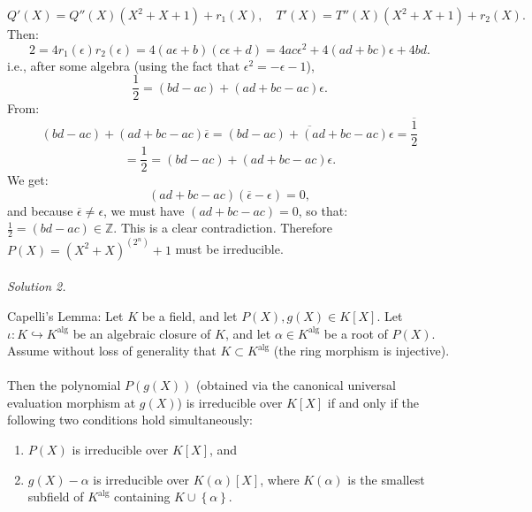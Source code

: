 \begin{solution}
    \[
        Q'\left(X\right) = Q''\left(X\right)\left( X^2 + X + 1 \right) + r_1\left(X\right), \quad T'\left(X\right) = T''\left(X\right)\left( X^2 + X + 1 \right) + r_2\left(X\right).
    \]
    Then:
    \[
        2 = 4 r_1\left(\epsilon\right) r_2\left(\epsilon\right) = 4\left(a\epsilon + b\right)\left(c\epsilon + d\right) = 4ac\epsilon^2 + 4\left(ad + bc\right)\epsilon + 4bd.
    \]
    i.e., after some algebra (using the fact that \( \epsilon^2 = -\epsilon - 1 \)),
    \[
        \frac{1}{2} = \left( bd - ac \right) + \left( ad + bc- ac \right) \epsilon.
    \]
    From:
    \[
        \left( bd - ac \right) + \left( ad + bc - ac \right) \overline{\epsilon} = \overline{\left( bd - ac \right) + \left( ad + bc - ac \right) \epsilon} = \overline{\frac{1}{2}}
    \]
    \[
        = \frac{1}{2} = \left( bd - ac \right) + \left( ad + bc - ac \right) \epsilon.
    \]
    We get:
    \[
        \left( ad + bc - ac \right) \left( \overline{\epsilon} - \epsilon \right) = 0,
    \]
    and because \( \overline{\epsilon} \neq \epsilon \), we must have \( \left( ad + bc - ac \right) = 0 \), so that: \( \frac{1}{2} = \left( bd - ac \right) \in \mathbb{Z} \). This is a clear contradiction. Therefore \( P\left(X\right)=\left(X^2+X\right)^{\left(2^n\right)}+1 \) must be irreducible.
    \\\\
    \textit{Solution 2.}
    \begin{lemma}{Capelli's Lemma:}
        Let \( K \) be a field, and let \( P\left(X\right), g\left(X\right) \in K\left[X\right] \). Let \( \iota:K \hookrightarrow K^{\text{alg}} \) be an algebraic closure of \( K \), and let \( \alpha \in K^{\text{alg}} \) be a root of \( P\left(X\right) \). Assume without loss of generality that \( K\subset K^{\text{alg}} \) (the ring morphism is injective).
        \\\\
        Then the polynomial \( P\left( g\left(X\right) \right) \) (obtained via the canonical universal evaluation morphism at \( g\left(X\right) \)) is irreducible over \( K\left[X\right] \) if and only if the following two conditions hold simultaneously:
        \begin{enumerate}
            \item \( P\left(X\right) \) is irreducible over \( K\left[X\right] \), and
            \item \( g\left(X\right) - \alpha \) is irreducible over \( K\left(\alpha\right)\left[X\right] \), where \( K\left(\alpha\right) \) is the smallest subfield of \( K^{\text{alg}} \) containing \( K\cup\left\{\alpha\right\} \).

\end{enumerate}
\end{lemma}
\end{solution}
